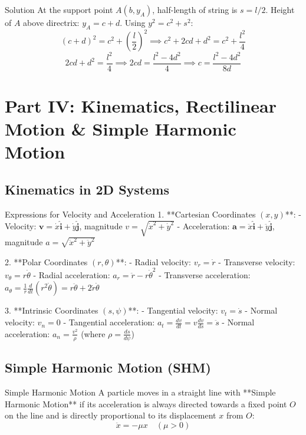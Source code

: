 \documentclass[11pt,a4paper]{article}
\begin{document}
\begin{proofbox}{Solution}
At the support point $A(b, y_A)$, half-length of string is $s = l/2$.
Height of $A$ above directrix: $y_A = c + d$.
Using $y^2 = c^2 + s^2$:
\[
(c + d)^2 = c^2 + \left(\frac{l}{2}\right)^2 \implies c^2 + 2cd + d^2 = c^2 + \frac{l^2}{4}
\]
\[
2cd + d^2 = \frac{l^2}{4} \implies 2cd = \frac{l^2 - 4d^2}{4} \implies c = \frac{l^2 - 4d^2}{8d}
\]
\end{proofbox}

\section{Part IV: Kinematics, Rectilinear Motion \& Simple Harmonic Motion}

\subsection{Kinematics in 2D Systems}

\begin{theorembox}{Expressions for Velocity and Acceleration}
1. **Cartesian Coordinates $(x, y)$**:
   - Velocity: $\mathbf{v} = \dot{x}\hat{\mathbf{i}} + \dot{y}\hat{\mathbf{j}}$, magnitude $v = \sqrt{\dot{x}^2 + \dot{y}^2}$
   - Acceleration: $\mathbf{a} = \ddot{x}\hat{\mathbf{i}} + \ddot{y}\hat{\mathbf{j}}$, magnitude $a = \sqrt{\ddot{x}^2 + \ddot{y}^2}$

2. **Polar Coordinates $(r, \theta)$**:
   - Radial velocity: $v_r = \dot{r}$
   - Transverse velocity: $v_\theta = r\dot{\theta}$
   - Radial acceleration: $a_r = \ddot{r} - r\dot{\theta}^2$
   - Transverse acceleration: $a_\theta = \frac{1}{r}\frac{d}{dt}(r^2\dot{\theta}) = r\ddot{\theta} + 2\dot{r}\dot{\theta}$

3. **Intrinsic Coordinates $(s, \psi)$**:
   - Tangential velocity: $v_t = \dot{s}$
   - Normal velocity: $v_n = 0$
   - Tangential acceleration: $a_t = \frac{dv}{dt} = v\frac{dv}{ds} = \ddot{s}$
   - Normal acceleration: $a_n = \frac{v^2}{\rho}$ (where $\rho = \frac{ds}{d\psi}$)
\end{theorembox}

\subsection{Simple Harmonic Motion (SHM)}

\begin{definitionbox}{Simple Harmonic Motion}
A particle moves in a straight line with **Simple Harmonic Motion** if its acceleration is always directed towards a fixed point $O$ on the line and is directly proportional to its displacement $x$ from $O$:
\begin{equation}
\ddot{x} = -\mu x \quad (\mu > 0)
\end{equation}
\end{definitionbox}
\end{document}
